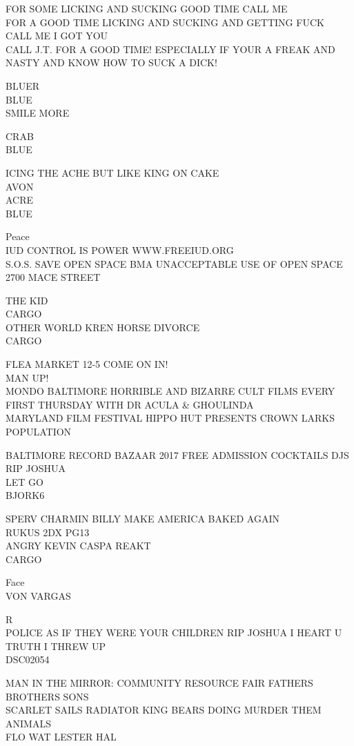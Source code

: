 \documentclass[10pt,letterpaper]{article}
\begin{document}
FOR SOME LICKING AND SUCKING GOOD TIME CALL ME\\
FOR A GOOD TIME LICKING AND SUCKING AND GETTING FUCK CALL ME I GOT YOU\\
CALL J.T. FOR A GOOD TIME!   ESPECIALLY IF YOUR A FREAK AND NASTY AND KNOW HOW TO SUCK A DICK!

BLUER\\
BLUE\\
SMILE MORE

CRAB\\
BLUE

ICING THE ACHE BUT LIKE KING ON CAKE\\
AVON\\
ACRE\\
BLUE

Peace\\
IUD CONTROL IS POWER WWW.FREEIUD.ORG\\
S.O.S. SAVE OPEN SPACE BMA UNACCEPTABLE USE OF OPEN SPACE 2700 MACE STREET

THE KID\\
CARGO\\
OTHER WORLD KREN HORSE DIVORCE\\
CARGO

FLEA MARKET 12{-}5 COME ON IN!\\
MAN UP!\\
MONDO BALTIMORE HORRIBLE AND BIZARRE CULT FILMS EVERY FIRST THURSDAY WITH DR ACULA \& GHOULINDA\\
MARYLAND FILM FESTIVAL HIPPO HUT PRESENTS CROWN LARKS POPULATION

BALTIMORE RECORD BAZAAR 2017 FREE ADMISSION COCKTAILS DJS\\
RIP JOSHUA\\
LET GO\\
BJORK6

SPERV CHARMIN BILLY MAKE AMERICA BAKED AGAIN\\
RUKUS 2DX PG13\\
ANGRY KEVIN CASPA REAKT\\
CARGO

Face\\
VON VARGAS

R\\
POLICE AS IF THEY WERE YOUR CHILDREN RIP JOSHUA I HEART U\\
TRUTH I THREW UP\\
DSC02054

MAN IN THE MIRROR: COMMUNITY RESOURCE FAIR FATHERS BROTHERS SONS\\
SCARLET SAILS RADIATOR KING BEARS DOING MURDER THEM ANIMALS\\
FLO WAT LESTER HAL
\end{document}
